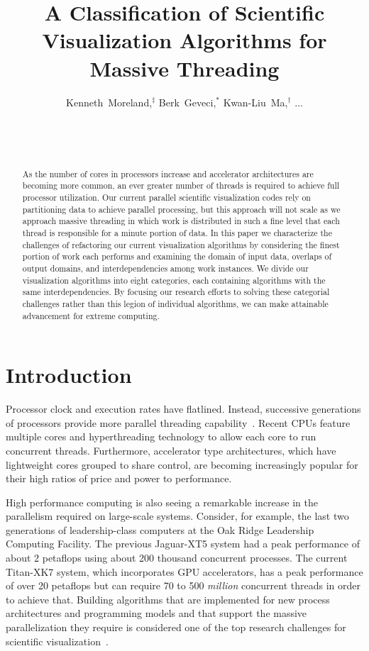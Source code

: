 \documentclass{sig-alternate}
\title{A Classification of Scientific Visualization Algorithms for Massive Threading}
\author{
  \alignauthor
  Kenneth~Moreland,$^{\ddagger}$ Berk~Geveci,$^*$ Kwan-Liu~Ma,$^{\dagger}$ ...\\
  \affaddr{$^{\ddagger}$Sandia National Laboratories}\\
  \affaddr{$^*$Kitware, Inc.}\\
  \affaddr{$^{\dagger}$University of California at Davis}\\
}
\newcommand*{\lcite}[1]{~\cite{#1}}
\begin{document}
\sloppy

\maketitle

\begin{abstract}

As the number of cores in processors increase and accelerator architectures
are becoming more common, an ever greater number of threads is required to
achieve full processor utilization. Our current parallel scientific
visualization codes rely on partitioning data to achieve parallel
processing, but this approach will not scale as we approach massive
threading in which work is distributed in such a fine level that each
thread is responsible for a minute portion of data. In this paper we
characterize the challenges of refactoring our current visualization
algorithms by considering the finest portion of work each performs and
examining the domain of input data, overlaps of output domains, and
interdependencies among work instances. We divide our visualization
algorithms into eight categories, each containing algorithms with the same
interdependencies. By focusing our research efforts to solving these
categorial challenges rather than this legion of individual algorithms, we
can make attainable advancement for extreme computing.

\end{abstract}

\section{Introduction}

\noindent
Processor clock and execution rates have flatlined. Instead, successive
generations of processors provide more parallel threading
capability\lcite{Sutter2005}. Recent CPUs feature multiple cores and
hyperthreading technology to allow each core to run concurrent
threads. Furthermore, accelerator type architectures, which have
lightweight cores grouped to share control, are becoming increasingly
popular for their high ratios of price and power to performance.

High performance computing is also seeing a remarkable increase in the
parallelism required on large-scale systems. Consider, for example, the
last two generations of leadership-class computers at the Oak Ridge
Leadership Computing Facility. The previous Jaguar-XT5 system had a peak
performance of about 2 petaflops using about 200 thousand concurrent
processes. The current Titan-XK7 system, which incorporates GPU
accelerators, has a peak performance of over 20 petaflops but can require
70 to 500 \emph{million} concurrent threads in order to achieve
that. Building algorithms that are implemented for new process
architectures and programming models and that support the massive
parallelization they require is considered one of the top research
challenges for scientific visualization\lcite{Childs2013}.
\end{document}
